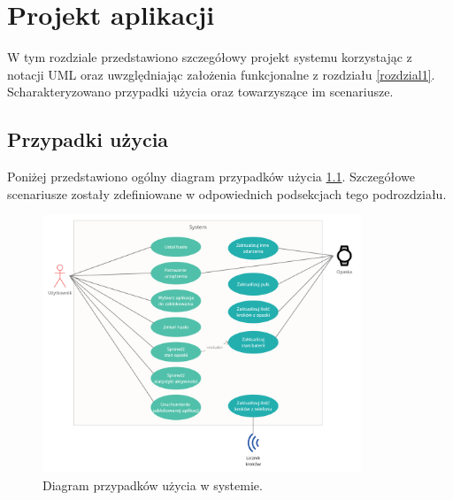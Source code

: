 \chapter{Projekt aplikacji}
\thispagestyle{chapterBeginStyle}
W tym rozdziale przedstawiono szczegółowy projekt systemu korzystając z notacji UML oraz uwzględniając założenia funkcjonalne z rozdziału \ref{rozdzial1}.
Scharakteryzowano przypadki użycia oraz towarzyszące im scenariusze.

\section{Przypadki użycia}
Poniżej przedstawiono ogólny diagram przypadków użycia \ref{use_case}. Szczegółowe scenariusze zostały zdefiniowane w odpowiednich podsekcjach tego podrozdziału.
\begin{figure}[H]
    \begin{center}
        \includegraphics[width=0.85\textwidth]{UseCaseDiagram.png}
    \end{center}
    \caption{{\color{dgray}Diagram przypadków użycia w systemie.}} \label{use_case}
\end{figure}

